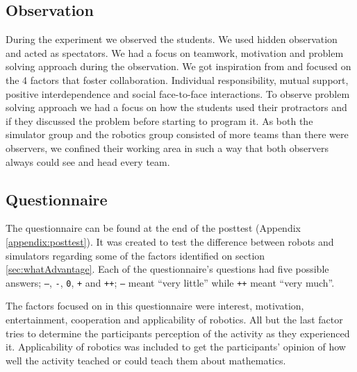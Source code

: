 \subsection*{Observation}
During the experiment we observed the students. We used hidden observation and acted as spectators. We had a focus on teamwork, motivation and problem solving approach during the observation. We got inspiration from  and focused on the 4 factors that foster collaboration. Individual responsibility, mutual support, positive interdependence and social face-to-face interactions. To observe problem solving approach we had a focus on how the students used their protractors and if they discussed the problem before starting to program it. As both the simulator group and the robotics group consisted of more teams than there were observers, we confined their working area in such a way that both observers always could see and head every team.

\subsection*{Questionnaire}
The questionnaire can be found at the end of the posttest (Appendix \ref{appendix:posttest}). It was created to test the difference between robots and simulators regarding some of the factors identified on section \ref{sec:whatAdvantage}. Each of the questionnaire's questions had five possible answers; \texttt{--}, \texttt{-}, \texttt{0}, \texttt{+} and \texttt{++}; \texttt{--} meant ``very little'' while \texttt{++} meant ``very much''.

\bigskip\noindent
The factors focused on in this questionnaire were interest, motivation, entertainment, cooperation and applicability of robotics. 
All but the last factor tries to determine the participants perception of the activity as they experienced it. Applicability of robotics was included to get the participants' opinion of how well the activity teached or could teach them about mathematics.


